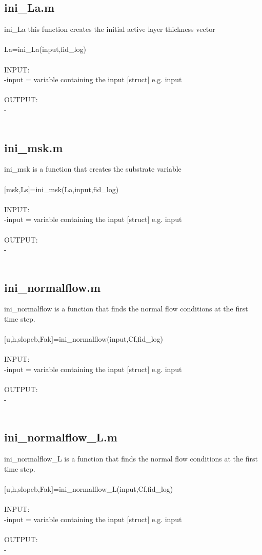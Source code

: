 \subsection{ini\_La.m}
ini\_La this function creates the initial active layer thickness vector \\ 
 \\ 
La=ini\_La(input,fid\_log) \\ 
 \\ 
INPUT: \\ 
   -input = variable containing the input $[$struct$]$ e.g. input \\ 
 \\ 
OUTPUT: \\ 
   - \\ 
 \\ 
\subsection{ini\_msk.m}
ini\_msk is a function that creates the substrate variable \\ 
 \\ 
$[$msk,Ls$]$=ini\_msk(La,input,fid\_log) \\ 
 \\ 
INPUT: \\ 
   -input = variable containing the input $[$struct$]$ e.g. input \\ 
 \\ 
OUTPUT: \\ 
   - \\ 
 \\ 
\subsection{ini\_normalflow.m}
ini\_normalflow is a function that finds the normal flow conditions at the first time step.  \\ 
 \\ 
$[$u,h,slopeb,Fak$]$=ini\_normalflow(input,Cf,fid\_log) \\ 
 \\ 
INPUT: \\ 
   -input = variable containing the input $[$struct$]$ e.g. input \\ 
 \\ 
OUTPUT: \\ 
   - \\ 
 \\ 
\subsection{ini\_normalflow\_L.m}
ini\_normalflow\_L is a function that finds the normal flow conditions at the first time step.  \\ 
 \\ 
$[$u,h,slopeb,Fak$]$=ini\_normalflow\_L(input,Cf,fid\_log) \\ 
 \\ 
INPUT: \\ 
   -input = variable containing the input $[$struct$]$ e.g. input \\ 
 \\ 
OUTPUT: \\ 
   - \\ 
 \\ 
